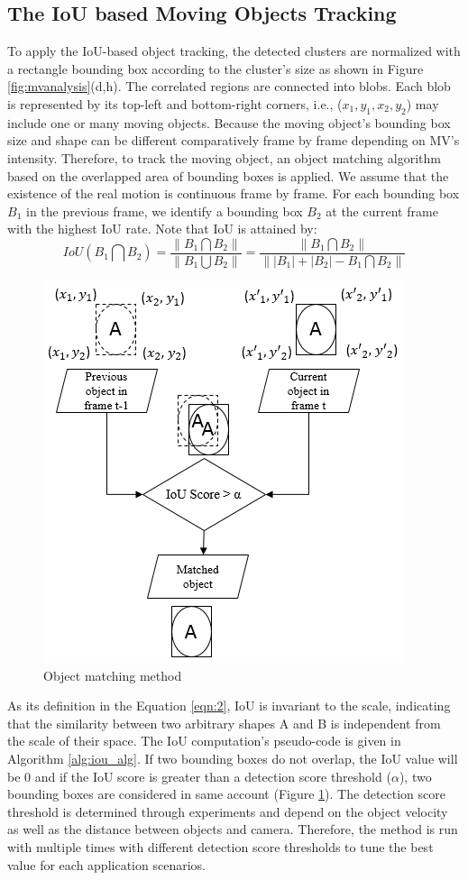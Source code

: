 \subsection{The IoU based Moving Objects Tracking}
\label{subsec:1}
To apply the IoU-based object tracking, the detected clusters are normalized with a rectangle bounding box according to the cluster's size as shown in Figure \ref{fig:mvanalysis}(d,h). The correlated regions are connected into blobs. Each blob is represented by its top-left and bottom-right corners, i.e.,  ($x_{1}, y_{1}, x_{2}, y_{2}$) may include one or many moving objects. Because the moving object's bounding box size and shape can be different comparatively frame by frame depending on MV’s intensity. Therefore, to track the moving object, an object matching algorithm based on the overlapped area of bounding boxes is applied. We assume that the existence of the real motion is continuous frame by frame. For each bounding box $B_{1}$ in the previous frame, we identify a bounding box $B_{2}$ at the current frame with the highest IoU rate. Note that IoU is attained by:\\
\begin{equation}
\label{eqn:2}
IoU(B_{1}\bigcap B_{2}) = \frac{\left \| B_{1}\bigcap B_{2} \right \|}{\left \| B_{1}\bigcup B_{2}  \right \|} =  \frac{\left \| B_{1}\bigcap B_{2} \right \|}{\left \| \left | B_{1} \right |  +  \left | B_{2} \right |  - B_{1}\bigcap B_{2} \right \|}
\end{equation} 
\begin{figure}
\centering
 \includegraphics[width=0.4\linewidth]{Figures/iou.png}
 \caption{Object matching method}
 \label{fig:iou}
\end{figure}
 As its definition in the Equation \ref{eqn:2}, IoU is invariant to the scale, indicating that the similarity between two arbitrary shapes A and B is independent from the scale of their space. The IoU computation’s pseudo-code is given in Algorithm \ref{alg:iou_alg}. If two bounding boxes do not overlap, the IoU value will be 0 and if the IoU score is greater than a detection score threshold ($\alpha$), two bounding boxes are considered in same account (Figure \ref{fig:iou}). The detection score threshold is determined through experiments and depend on the object velocity as well as the distance between objects and camera. Therefore, the method is run with multiple times with different detection score thresholds to tune the best value for each application scenarios. 
